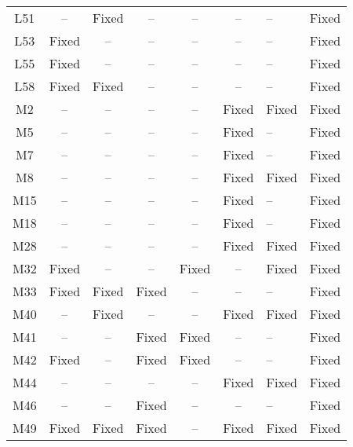 \begin{table}[!t]
{\begin{tabular}{|c|c|c|c|c|c|}
L51               & --        & Fixed     & --        & --        & --        & --        &Fixed   \\
L53               & Fixed     & --        & --        & --        & --        & --        &Fixed   \\
L55               & Fixed     & --        & --        & --        & --        & --        &Fixed   \\
L58               & Fixed     & Fixed     & --        & --        & --        & --        &Fixed   \\
\hline
M2                & --        & --        & --        & --        & Fixed     & Fixed     &Fixed   \\
M5                & --        & --        & --        & --        & Fixed     & --        &Fixed   \\
M7                & --        & --        & --        & --        & Fixed     & --        &Fixed   \\
M8                & --        & --        & --        & --        & Fixed     & Fixed     &Fixed   \\
M15               & --        & --        & --        & --        & Fixed     & --        &Fixed   \\
M18               & --        & --        & --        & --        & Fixed     & --        &Fixed   \\
M28               & --        & --        & --        & --        & Fixed     & Fixed     &Fixed   \\
M32               & Fixed     & --        & --        & Fixed     & --        & Fixed     &Fixed   \\
M33               & Fixed     & Fixed     & Fixed     & --        & --        & --        &Fixed   \\
M40               & --        & Fixed     & --        & --        & Fixed     & Fixed     &Fixed   \\
M41               & --        & --        & Fixed     & Fixed     & --        & --        &Fixed   \\
M42               & Fixed     & --        & Fixed     & Fixed     & --        & --        &Fixed   \\
M44               & --        & --        & --        & --        & Fixed     & Fixed     &Fixed   \\
M46               & --        & --        & Fixed     & --        & --        & --        &Fixed   \\
M49               & Fixed     & Fixed     & Fixed     & --        & Fixed     & Fixed     &Fixed   \\

\end{tabular}}
\end{table}
